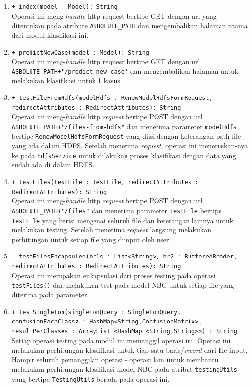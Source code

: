 \begin{enumerate}
\begin{enumerate}
			\item \texttt{+ index(model : Model): String}\\
			Operasi ini meng-\textit{handle} http request bertipe GET dengan url yang ditentukan pada atribute \verb|ASBOLUTE_PATH| dan mengembalikan halaman utama dari modul klasifikasi ini.

			\item \texttt{+ predictNewCase(model : Model): String}\\
			Operasi ini meng-\textit{handle} http request bertipe GET dengan url \verb|ASBOLUTE_PATH+"/predict-new-case"| dan mengembalikan halaman untuk melakukan klasifikasi untuk 1 kasus.

			\item \texttt{+ testFileFromHdfs(modelHdfs : RenewModelHdfsFormRequest, redirectAttributes : RedirectAttributes): String}\\
			Operasi ini meng-\textit{handle} http \textit{request} bertipe POST dengan url \verb|ASBOLUTE_PATH+"/files-from-hdfs"| dan menerima parameter \texttt{modelHdfs} bertipe \texttt{RenewModelHdfsFormRequest} yang diisi dengan keterangan path file yang ada dalam HDFS. Setelah menerima \textit{request}, operasi ini meneruskan-nya ke pada \texttt{hdfsService} untuk dilakukan proses klasifikasi dengan data yang sudah ada di dalam HDFS. 

			\item \texttt{+ testFiles(testFile : TestFile, redirectAttributes : RedirectAttributes): String}\\
			Operasi ini meng-\textit{handle} http \textit{request} bertipe POST dengan url \verb|ASBOLUTE_PATH+"/files"| dan menerima parameter \texttt{testFile} bertipe \texttt{TestFile} yang berisi mengenai seluruh file dan keterangan lainnya untuk melakukan testing. Setelah menerima \textit{request} langsung melakukan perhitungan untuk setiap file yang diinput oleh user. 


			\item \texttt{- testFilesEncapsuled(br1s : List<String>, br2 : BufferedReader, redirectAttributes : RedirectAttributes): String}\\
			Operasi ini merupakan enkapsulasi dari proses testing pada operasi \texttt{testFiles()} dan melakukan test pada model NBC untuk setiap file yang diterima pada parameter.


			\item \texttt{+ testSingleton(singletonQuery : SingletonQuery, confusionEachClassz : HashMap<String,ConfusionMatrix>, resultPerClasses : ArrayList <HashMap <String,String>>) : String}\\
			Setiap operasi testing pada modul ini memanggil operasi ini. Operasi ini melakukan perhitungan klasifikasi untuk tiap satu baris/\textit{record} dari file input. Hampir seluruh pemanggilan operasi - operasi lain untuk membantu melakukan perhitungan klasifikasi model NBC pada atribut \texttt{testingUtils} yang bertipe \texttt{TestingUtils} berada pada operasi ini.


\end{enumerate}
\end{enumerate}
